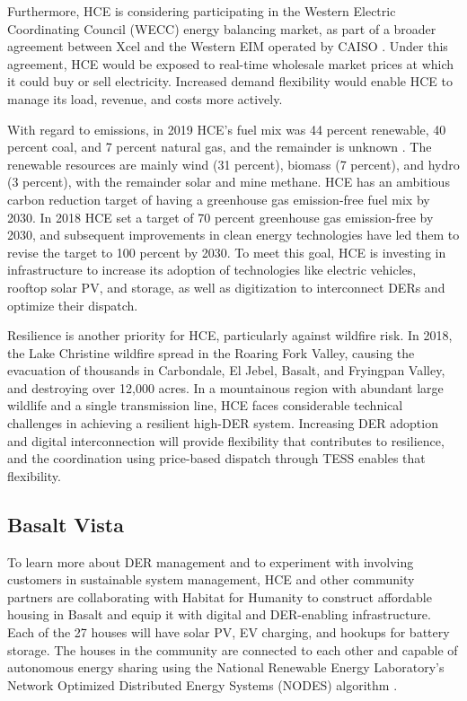 \documentclass[12pt]{article}{Definitions/mdpi}
\begin{document}
Furthermore, HCE is considering participating in the Western Electric Coordinating Council (WECC) energy balancing market, as part of a broader agreement between Xcel and the Western EIM operated by CAISO \citep{CAISO2020}. Under this agreement, HCE would be exposed to real-time wholesale market prices at which it could buy or sell electricity. Increased demand flexibility would enable HCE to manage its load, revenue, and costs more actively.

With regard to emissions, in 2019 HCE's fuel mix was 44 percent renewable, 40 percent coal, and 7 percent natural gas, and the remainder is unknown \citep{HCE2019}. The renewable resources are mainly wind (31 percent), biomass (7 percent), and hydro (3 percent), with the remainder solar and mine methane. HCE has an ambitious carbon reduction target of having a greenhouse gas emission-free fuel mix by 2030. In 2018 HCE set a target of 70 percent greenhouse gas emission-free by 2030, and subsequent improvements in clean energy technologies have led them to revise the target to 100 percent by 2030. To meet this goal, HCE is investing in infrastructure to increase its adoption of technologies like electric vehicles, rooftop solar PV, and storage, as well as digitization to interconnect DERs and optimize their dispatch. 

Resilience is another priority for HCE, particularly against wildfire risk. In 2018, the Lake Christine wildfire spread in the Roaring Fork Valley, causing the evacuation of thousands in Carbondale, El Jebel, Basalt, and Fryingpan Valley, and destroying over 12,000 acres. In a mountainous region with abundant large wildlife and a single transmission line, HCE faces considerable technical challenges in achieving a resilient high-DER system. Increasing DER adoption and digital interconnection will provide flexibility that contributes to resilience, and the coordination using price-based dispatch through TESS enables that flexibility.

\subsection{Basalt Vista}\label{sec:Basalt}

To learn more about DER management and to experiment with involving customers in sustainable system management, HCE and other community partners are collaborating with Habitat for Humanity to construct affordable housing in Basalt and equip it with digital and DER-enabling infrastructure. Each of the 27 houses will have solar PV, EV charging, and hookups for battery storage. The houses in the community are connected to each other and capable of autonomous energy sharing using the National Renewable Energy Laboratory's Network Optimized Distributed Energy Systems (NODES) algorithm \citep{IEEESpectrumNREL}. 
\end{document}
